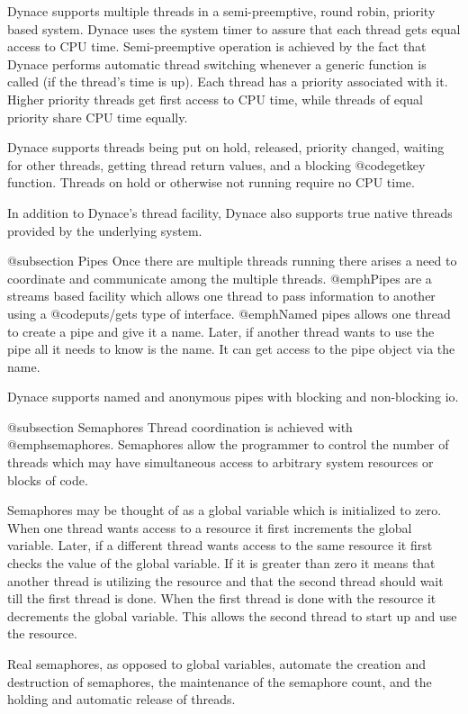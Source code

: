 Dynace supports multiple threads in a semi-preemptive, round robin,
priority based system.  Dynace uses the system timer to assure that
each thread gets equal access to CPU time.  Semi-preemptive operation
is achieved by the fact that Dynace performs automatic thread switching
whenever a generic function is called (if the thread's time is up).
Each thread has a priority associated with it.  Higher priority
threads get first access to CPU time, while threads of equal priority
share CPU time equally.

Dynace supports threads being put on hold, released, priority changed,
waiting for other threads, getting thread return values, and a
blocking @code{getkey} function.  Threads on hold or otherwise not
running require no CPU time.

In addition to Dynace's thread facility, Dynace also supports true
native threads provided by the underlying system.


@subsection Pipes
Once there are multiple threads running there arises a need to coordinate
and communicate among the multiple threads.  @emph{Pipes} are a
streams based facility which allows one thread to pass information
to another using a @code{puts/gets} type of interface.  @emph{Named pipes}
allows one thread to create a pipe and give it a name.  Later, if another
thread wants to use the pipe all it needs to know is the name.  It can
get access to the pipe object via the name.

Dynace supports named and anonymous pipes with blocking and non-blocking
io.

@subsection Semaphores
Thread coordination is achieved with @emph{semaphores}.  Semaphores allow
the programmer to control the number of threads which may have simultaneous
access to arbitrary system resources or blocks of code.

Semaphores may be thought of as a global variable which is initialized
to zero.  When one thread wants access to a resource it first increments
the global variable.  Later, if a different thread wants access to the
same resource it first checks the value of the global variable.  If it
is greater than zero it means that another thread is utilizing the
resource and that the second thread should wait till the first thread is
done.  When the first thread is done with the resource it decrements the
global variable.  This allows the second thread to start up and use
the resource.

Real semaphores, as opposed to global variables, automate the creation and
destruction of semaphores, the maintenance of the semaphore count, and
the holding and automatic release of threads.

